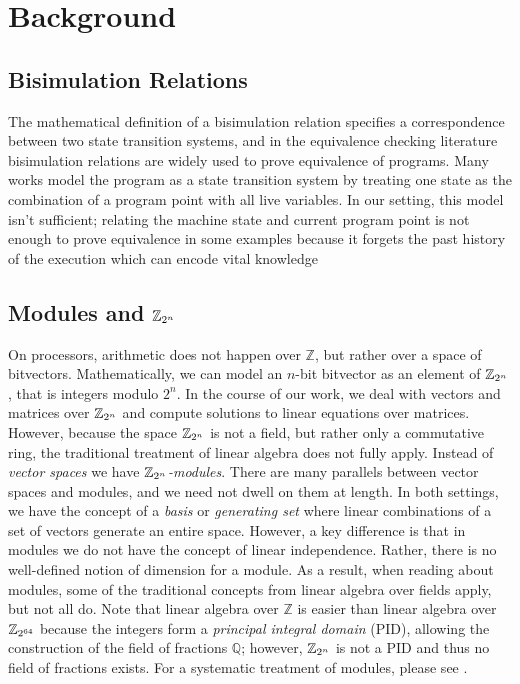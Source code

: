 \section{Background}

\subsection{Bisimulation Relations}

The mathematical definition of a bisimulation relation specifies
a correspondence between two state transition systems, and in the
equivalence checking literature bisimulation relations are widely
used to prove equivalence of programs. Many works model the program as
a state transition system by treating one state as the combination of
a program point with all live variables. In our setting, this model
isn't sufficient; relating the machine state and current program point
is not enough to prove equivalence in some examples because it forgets
the past history of the execution which can encode vital knowledge

\subsection{Modules and $\mathbb{Z}_{2^{n}}$}

On processors, arithmetic does not happen over $\mathbb{Z}$, but
rather over a space of bitvectors. Mathematically, we can model
an $n$-bit bitvector as an element of $\mathbb{Z}_{2^{n}}$, that is integers
modulo $2^n$. In the course of our work, we deal with vectors and
matrices over $\mathbb{Z}_{2^{n}}$ and compute solutions to linear equations over
matrices. However, because the space $\mathbb{Z}_{2^{n}}$ is not a field, but
rather only a commutative ring, the traditional treatment of linear
algebra does not fully apply. Instead of \emph{vector spaces} we
have \emph{$\mathbb{Z}_{2^{n}}$-modules}. There are many parallels between vector
spaces and modules, and we need not dwell on them at length. In both
settings, we have the concept of a \emph{basis} or \emph{generating
set} where linear combinations of a set of vectors generate an
entire space. However, a key difference is that in modules we do
not have the concept of linear independence. Rather, there is no
well-defined notion of dimension for a module. As a result, when
reading about modules, some of the traditional concepts from linear
algebra over fields apply, but not all do. Note that linear algebra
over $\mathbb{Z}$ is easier than linear algebra over $\mathbb{Z}_{2^{64}}$ because
the integers form a \emph{principal integral domain} (PID), allowing
the construction of the field of fractions $\mathbb{Q}$; however,
$\mathbb{Z}_{2^{n}}$ is not a PID and thus no field of fractions exists. For a
systematic treatment of modules, please see .


